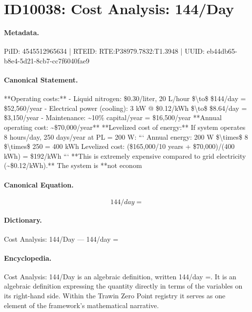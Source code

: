 \section*{ID10038: Cost Analysis: 144/Day}
\paragraph{Metadata.}
PiID: 4545512965634 | RTEID: RTE:P38979.7832:T1.3948 | UUID: eb44db65-b8e4-5d21-8cb7-cc7f6040fae9

\paragraph{Canonical Statement.}
**Operating costs:** - Liquid nitrogen: \$0.30/liter, 20 L/hour \$\textbackslash{}to\$ \$144/day = \$52,560/year - Electrical power (cooling): 3 kW @ \$0.12/kWh \$\textbackslash{}to\$ \$8.64/day = \$3,150/year - Maintenance: \textasciitilde{}10\% capital/year = \$16,500/year **Annual operating cost: \textasciitilde{}\$70,000/year** **Levelized cost of energy:** If system operates 8 hours/day, 250 days/year at PL = 200 W: ``` Annual energy: 200 W \$\textbackslash{}times\$ 8 \$\textbackslash{}times\$ 250 = 400 kWh Levelized cost: (\$165,000/10 years + \$70,000)/(400 kWh) = \$192/kWh ``` **This is extremely expensive compared to grid electricity (\textasciitilde{}\$0.12/kWh).** The system is **not econom

\paragraph{Canonical Equation.}
\[
144/day =
\]

\paragraph{Dictionary.}
Cost Analysis: 144/Day — 144/day =

\paragraph{Encyclopedia.}
Cost Analysis: 144/Day is an algebraic definition, written 144/day =. It is an algebraic definition expressing the quantity directly in terms of the variables on its right-hand side. Within the Trawin Zero Point registry it serves as one element of the framework's mathematical narrative.
